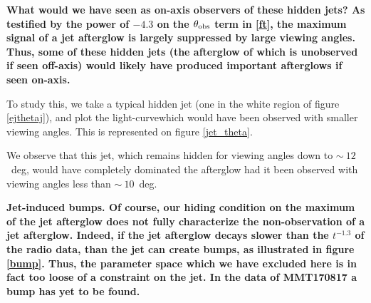\bf{What would we have seen as on-axis observers of these hidden jets?} As testified by the power of $-4.3$ on the $\theta_{\mathrm{obs}}$ term in \ref{ft}, the maximum signal of a jet afterglow is largely suppressed by large viewing angles. Thus, some of these hidden jets (the afterglow of which is unobserved if seen off-axis) would likely have produced important afterglows if seen on-axis.

To study this, we take a typical hidden jet (one in the white region of figure \ref{ejthetaj}), and plot the light-curvewhich would have been observed with smaller viewing angles. This is represented on figure \ref{jet_theta}.


We observe that this jet, which remains hidden for viewing angles down to $\sim~12$~deg, would have completely dominated the afterglow had it been observed with viewing angles less than $\sim~10$~deg.


\bf{Jet-induced bumps.} Of course, our hiding condition on the maximum of the jet afterglow does not fully characterize the non-observation of a jet afterglow. Indeed, if the jet afterglow decays slower than the $t^{-1.3}$ of the radio data, than the jet can create bumps, as illustrated in figure \ref{bump}. Thus, the parameter space which we have excluded here is in fact too loose of a constraint on the jet. In the data of MMT170817 a bump has yet to be found.


